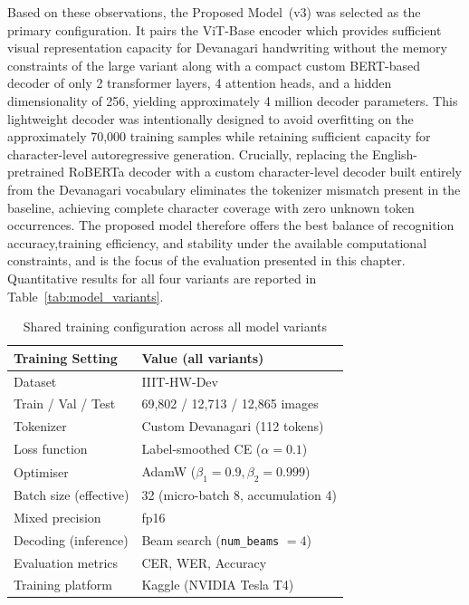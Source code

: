 \noindent Based on these observations, the Proposed Model~(v3) was selected as the primary configuration. It pairs the ViT-Base encoder which provides sufficient visual representation capacity for Devanagari handwriting without the memory constraints of the large variant along with a compact custom BERT-based decoder of only 2 transformer layers, 4 attention heads, and a hidden dimensionality of 256, yielding approximately 4 million decoder parameters. This lightweight decoder was intentionally designed to avoid overfitting on the approximately 70,000 training samples while retaining sufficient capacity for character-level autoregressive generation.
Crucially, replacing the English-pretrained RoBERTa decoder with a custom character-level decoder built entirely from the Devanagari vocabulary eliminates the tokenizer mismatch present in the baseline, achieving complete character coverage with zero unknown token occurrences. The proposed model therefore offers the best balance of recognition accuracy,training efficiency, and stability under the available computational constraints, and is the focus of the evaluation presented in this chapter.
Quantitative results for all four variants are reported in
Table~\ref{tab:model_variants}.
\begin{table}[H]
\centering
\vspace{8pt}
\renewcommand{\arraystretch}{1.4}
\begin{tabular}{|l|l|}
\hline
\textbf{Training Setting} & \textbf{Value (all variants)} \\ \hline
Dataset                  & IIIT-HW-Dev \\ \hline
Train / Val / Test       & 69,802 / 12,713 / 12,865 images \\ \hline
Tokenizer                & Custom Devanagari (112 tokens) \\ \hline
Loss function            & Label-smoothed CE ($\alpha = 0.1$) \\ \hline
Optimiser                & AdamW ($\beta_1=0.9, \beta_2=0.999$) \\ \hline
Batch size (effective)   & 32 (micro-batch 8, accumulation 4) \\ \hline
Mixed precision          & fp16 \\ \hline
Decoding (inference)     & Beam search (\texttt{num\_beams} $= 4$) \\ \hline
Evaluation metrics       & CER, WER, Accuracy \\ \hline
Training platform        & Kaggle (NVIDIA Tesla T4) \\ \hline
\end{tabular}
\caption{Shared training configuration across all model variants}
\label{tab:shared_config}
\end{table}

